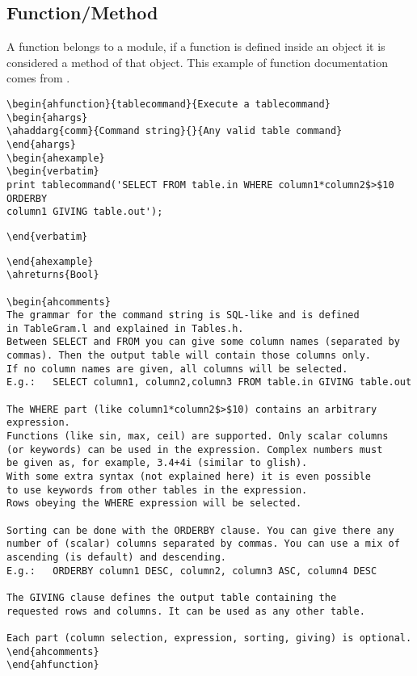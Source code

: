 \subsection{Function/Method}
A function belongs to a module, if a function is defined inside an
object it is considered a method of that object. 
\label{197doc:function_example}
This example of function documentation comes from
.
\begin{verbatim}
\begin{ahfunction}{tablecommand}{Execute a tablecommand}
\begin{ahargs}
\ahaddarg{comm}{Command string}{}{Any valid table command}
\end{ahargs}
\begin{ahexample}
\begin{verbatim}
print tablecommand('SELECT FROM table.in WHERE column1*column2$>$10 ORDERBY 
column1 GIVING table.out');
\end{verbatim}
\verb!\end{verbatim}!
\begin{verbatim}
\end{ahexample}
\ahreturns{Bool}

\begin{ahcomments}
The grammar for the command string is SQL-like and is defined
in TableGram.l and explained in Tables.h.
Between SELECT and FROM you can give some column names (separated by
commas). Then the output table will contain those columns only.
If no column names are given, all columns will be selected.
E.g.:   SELECT column1, column2,column3 FROM table.in GIVING table.out

The WHERE part (like column1*column2$>$10) contains an arbitrary expression.
Functions (like sin, max, ceil) are supported. Only scalar columns
(or keywords) can be used in the expression. Complex numbers must
be given as, for example, 3.4+4i (similar to glish).
With some extra syntax (not explained here) it is even possible
to use keywords from other tables in the expression.
Rows obeying the WHERE expression will be selected.

Sorting can be done with the ORDERBY clause. You can give there any
number of (scalar) columns separated by commas. You can use a mix of
ascending (is default) and descending.
E.g.:   ORDERBY column1 DESC, column2, column3 ASC, column4 DESC

The GIVING clause defines the output table containing the
requested rows and columns. It can be used as any other table.

Each part (column selection, expression, sorting, giving) is optional.
\end{ahcomments}
\end{ahfunction}
\end{verbatim}


